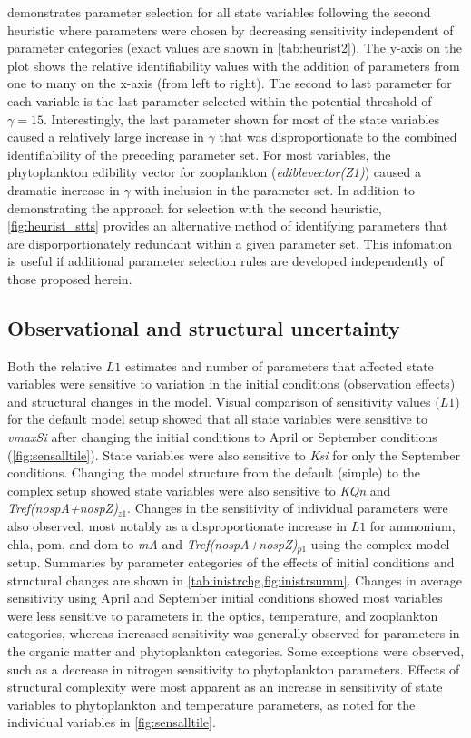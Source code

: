 \documentclass[letterpaper,12pt,oneside]{article}\usepackage[]{graphicx}\usepackage[]{color}
\begin{document}
 demonstrates parameter selection for all state variables following the second heuristic where parameters were chosen by decreasing sensitivity independent of parameter categories (exact values are shown in \cref{tab:heurist2}).  The y-axis on the plot shows the relative identifiability values with the addition of parameters from one to many on the x-axis (from left to right).  The second to last parameter for each variable is the last parameter selected within the potential threshold of $\gamma = 15$.  Interestingly, the last parameter shown for most of the state variables caused a relatively large increase in $\gamma$ that was disproportionate to the combined identifiability of the preceding parameter set. For most variables, the phytoplankton edibility vector for zooplankton (\textit{ediblevector(Z1)}) caused a dramatic increase in $\gamma$ with inclusion in the parameter set.  In addition to demonstrating the approach for selection with the second heuristic, \cref{fig:heurist_stts} provides an alternative method of identifying parameters that are disporportionately redundant within a given parameter set.  This infomation is useful if additional parameter selection rules are developed independently of those proposed herein. 

\subsection{Observational and structural uncertainty}

Both the relative $L1$ estimates and number of parameters that affected state variables were sensitive to variation in the initial conditions (observation effects) and structural changes in the model.  Visual comparison of sensitivity values ($L1$) for the default model setup showed that all state variables were sensitive to \textit{vmaxSi} after changing the initial conditions to April or September conditions (\cref{fig:sensalltile}).  State variables were also sensitive to \textit{Ksi} for only the September conditions. Changing the model structure from the default (simple) to the complex setup showed state variables were also sensitive to \textit{KQn} and \textit{Tref(nospA+nospZ)$_{z1}$}.  Changes in the sensitivity of individual parameters were also observed, most notably as a disproportionate increase in $L1$ for ammonium, \ac{chla}, \ac{pom}, and \ac{dom} to \textit{mA} and \textit{Tref(nospA+nospZ)$_{p1}$} using the complex model setup.  Summaries by parameter categories of the effects of initial conditions and structural changes are shown in \cref{tab:inistrchg,fig:inistrsumm}. Changes in average sensitivity using April and September initial conditions showed most variables were less sensitive to parameters in the optics, temperature, and zooplankton categories, whereas increased sensitivity was generally observed for parameters in the organic matter and phytoplankton categories.  Some exceptions were observed, such as a decrease in nitrogen sensitivity to phytoplankton parameters.  Effects of structural complexity were most apparent as an increase in sensitivity of state variables to phytoplankton and temperature parameters, as noted for the individual variables in \cref{fig:sensalltile}. 
\end{document}
